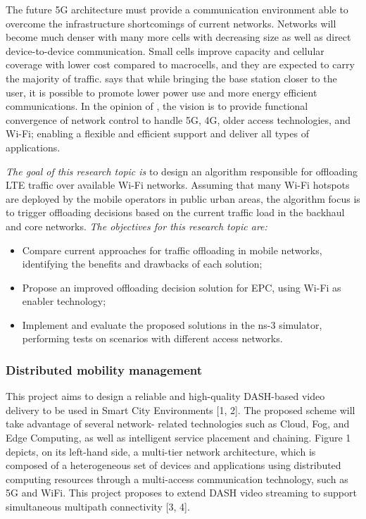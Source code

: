 The future 5G architecture must provide a communication environment able to
overcome the infrastructure shortcomings of current networks. Networks will
become much denser with many more cells with decreasing size as well as direct
device-to-device communication. Small cells improve capacity and cellular
coverage with lower cost compared to macrocells, and they are expected to carry
the majority of traffic. \citet{Pierucci2015} says that while bringing the base
station closer to the user, it is possible to promote lower power use and more
energy efficient communications. In the opinion of \citet{Einsiedler2015}, the
vision is to provide functional convergence of network control to handle 5G,
4G, older access technologies, and Wi-Fi; enabling a flexible and efficient
support and deliver all types of applications.

\emph{The goal of this research topic is} to design an algorithm responsible
for offloading \ac{LTE} traffic over available Wi-Fi networks. Assuming that
many Wi-Fi hotspots are deployed by the mobile operators in public urban areas,
the algorithm focus is to trigger offloading decisions based on the current
traffic load in the backhaul and core networks.
\emph{The objectives for this research topic are:}
\begin{itemize}
  \item Compare current approaches for traffic offloading in mobile networks,
  identifying the benefits and drawbacks of each solution;

  \item Propose an improved offloading decision solution for \ac{EPC}, using
  Wi-Fi as enabler technology;

  \item Implement and evaluate the proposed solutions in the \ac{ns-3}
  simulator, performing tests on scenarios with different access networks.
\end{itemize}

\subsubsection{Distributed mobility management}
\label{subsec:handover}

This project aims to design a reliable and high-quality DASH-based video delivery to be used in
Smart City Environments [1, 2]. The proposed scheme will take advantage of several network-
related technologies such as Cloud, Fog, and Edge Computing, as well as intelligent service
placement and chaining. Figure 1 depicts, on its left-hand side, a multi-tier network architecture,
which is composed of a heterogeneous set of devices and applications using distributed computing
resources through a multi-access communication technology, such as 5G and WiFi. This project
proposes to extend DASH video streaming to support simultaneous multipath connectivity [3, 4].


